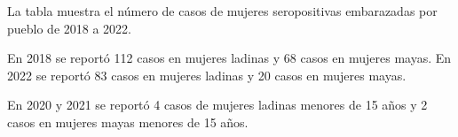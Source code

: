 La tabla muestra el número de casos de mujeres seropositivas embarazadas por pueblo de 2018 a 2022.  

En 2018 se reportó 112 casos en mujeres ladinas y 68 casos en mujeres mayas. En 2022 se reportó 83 casos en mujeres ladinas y 20 casos en mujeres mayas. 

En 2020 y 2021 se reportó 4 casos de mujeres ladinas menores de 15 años y 2 casos en mujeres mayas menores de 15 años. 